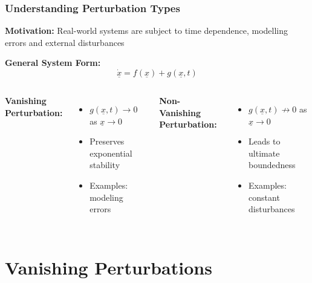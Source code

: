 \documentclass[student, noshadow, lsr, english, aspectratio=169, t]{ITR_LSR_slides}
\begin{document}



\begin{frame}
	\frametitle{Understanding Perturbation Types}

	\textbf{Motivation:} Real-world systems are subject to time dependence, modelling errors and external disturbances
	
	\vspace{0.5cm}
	\textbf{General System Form:} 
	\[\dot{\underline{x}} = f(\underline{x}) + g(\underline{x}, t)\]
	
	\vspace{0.5cm}
	\begin{columns}[t,totalwidth=\textwidth]
		\textbf{Vanishing Perturbation:}
		\begin{itemize}
			\item $g(\underline{x}, t) \to 0$ as $\underline{x} \to 0$
			\item Preserves exponential stability
			\item Examples: modeling errors
		\end{itemize}

		\textbf{Non-Vanishing Perturbation:}
		\begin{itemize}
			\item $g(\underline{x}, t) \not\to 0$ as $\underline{x} \to 0$
			\item Leads to ultimate boundedness
			\item Examples: constant disturbances
		\end{itemize}
    \end{columns}
\end{frame}


\section{Vanishing Perturbations}
\end{document}

